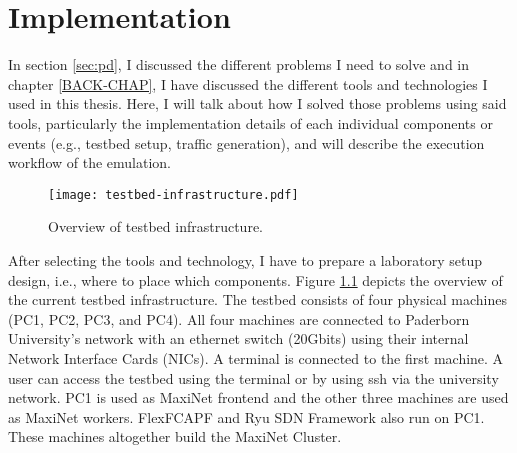 
\chapter{Implementation}\label{IMPL-CHAP}
In section \ref{sec:pd}, I discussed the different problems I need to solve and in chapter \ref{BACK-CHAP}, I have discussed the different tools and technologies I used in this thesis. Here, I will talk about how I solved those problems using said tools, particularly the implementation details of each individual components or events (e.g., testbed setup, traffic generation), and will describe the execution workflow of the emulation.

\begin{figure}[H]
	\begin{center}
		\resizebox{\textwidth}{!}
		{\texttt{[image: testbed-infrastructure.pdf]}}
		\caption{Overview of testbed infrastructure.}
		\label{fig:testinfra}
	\end{center}
\end{figure}

After selecting the tools and technology, I have to prepare a laboratory setup design, i.e., where to place which components. Figure \ref{fig:testinfra} depicts the overview of the current testbed infrastructure. The testbed consists of four physical machines (PC1, PC2, PC3, and PC4). All four machines are connected to Paderborn University's network with an ethernet switch (20Gbits) using their internal Network Interface Cards (NICs). A terminal is connected to the first machine. A user can access the testbed using the terminal or by using ssh via the university network. PC1 is used as MaxiNet frontend and the other three machines are used as MaxiNet workers. FlexFCAPF and Ryu SDN Framework also run on PC1. These machines altogether build the MaxiNet Cluster.

